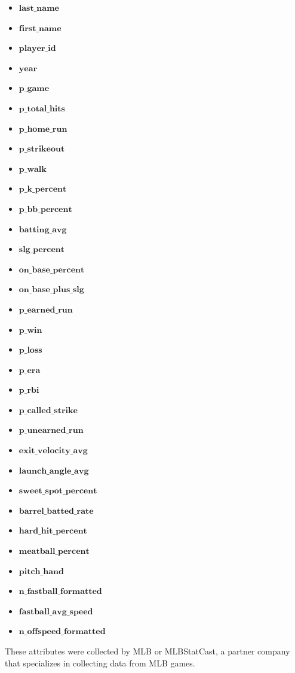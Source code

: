 \documentclass[12pt]{article}
\begin{document}
\begin{itemize}
    \item $\textbf{last\_name}$
    \item $\textbf{first\_name}$
    \item $\textbf{player\_id}$
    \item $\textbf{year}$
    \item $\textbf{p\_game}$
    \item $\textbf{p\_total\_hits}$
    \item $\textbf{p\_home\_run}$
    \item $\textbf{p\_strikeout}$
    \item $\textbf{p\_walk}$
    \item $\textbf{p\_k\_percent}$
    \item $\textbf{p\_bb\_percent}$
    \item $\textbf{batting\_avg}$
    \item $\textbf{slg\_percent}$
    \item $\textbf{on\_base\_percent}$
    \item $\textbf{on\_base\_plus\_slg}$
    \item $\textbf{p\_earned\_run}$
    \item $\textbf{p\_win}$
    \item $\textbf{p\_loss}$
    \item $\textbf{p\_era}$
    \item $\textbf{p\_rbi}$
    \item $\textbf{p\_called\_strike}$
    \item $\textbf{p\_unearned\_run}$
    \item $\textbf{exit\_velocity\_avg}$
    \item $\textbf{launch\_angle\_avg}$
    \item $\textbf{sweet\_spot\_percent}$
    \item $\textbf{barrel\_batted\_rate}$
    \item $\textbf{hard\_hit\_percent}$
    \item $\textbf{meatball\_percent}$
    \item $\textbf{pitch\_hand}$
    \item $\textbf{n\_fastball\_formatted}$
    \item $\textbf{fastball\_avg\_speed}$
    \item $\textbf{n\_offspeed\_formatted}$
\end{itemize}
These attributes were collected by MLB or MLBStatCast, a partner company that specializes in collecting data from MLB games.  
\end{document}
